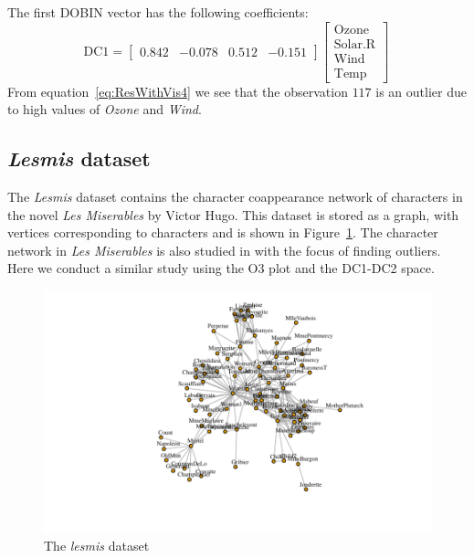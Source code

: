 \documentclass[11pt]{article}
\begin{document}
The first DOBIN vector has the following coefficients:
\begin{equation}\label{eq:ResWithVis4}
    \text{DC1} = \begin{bmatrix}
    0.842 & -0.078 &  0.512 & -0.151   
    \end{bmatrix}
    \begin{bmatrix}
    \text{Ozone} \\
    \text{Solar.R} \\
    \text{Wind} \\
    \text{Temp} 
    \end{bmatrix} \, 
\end{equation}
From equation~\eqref{eq:ResWithVis4} we see that the observation $117$ is an outlier due to high values of \textit{Ozone} and \textit{Wind}. 

\subsection{\textit{Lesmis} dataset}\label{sec:ResWithVis5}
The \textit{Lesmis} dataset \citep{sombrero} contains the character coappearance network of characters in the novel \textit{Les Miserables} by Victor Hugo. This dataset is stored as a graph, with vertices corresponding to characters and is shown in Figure~\ref{fig:lesmisgraph}. The character network in \textit{Les Miserables} is also studied in \cite{wilkinson2017visualizing} with the focus of finding outliers. Here we conduct a similar study using the O3 plot and the DC1-DC2 space. \\

\begin{figure}
	\centering
	\includegraphics{lesmis.pdf}
	\caption{The \textit{lesmis} dataset }
	\label{fig:lesmisgraph}
\end{figure}
\end{document}
